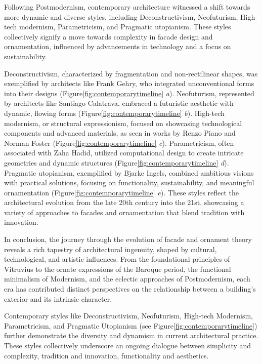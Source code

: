 
Following Postmodernism, contemporary architecture witnessed a shift towards more dynamic and diverse styles, including Deconstructivism, Neofuturism, High-tech modernism, Parametricism, and Pragmatic utopianism.
These styles collectively signify a move towards complexity in facade design and ornamentation, influenced by advancements in technology and a focus on sustainability.

Deconstructivism, characterized by fragmentation and non-rectilinear shapes, was exemplified by architects like Frank Gehry, who integrated unconventional forms into their designs (Figure\ref{fig:contemporarytimeline} \textit{a}).
Neofuturism, represented by architects like Santiago Calatrava, embraced a futuristic aesthetic with dynamic, flowing forms (Figure\ref{fig:contemporarytimeline} \textit{b}).
High-tech modernism, or structural expressionism, focused on showcasing technological components and advanced materials, as seen in works by Renzo Piano and Norman Foster (Figure\ref{fig:contemporarytimeline} \textit{c}).
Parametricism, often associated with Zaha Hadid, utilized computational design to create intricate geometries and dynamic structures (Figure\ref{fig:contemporarytimeline} \textit{d}).
Pragmatic utopianism, exemplified by Bjarke Ingels, combined ambitious visions with practical solutions, focusing on functionality, sustainability, and meaningful ornamentation (Figure\ref{fig:contemporarytimeline} \textit{e}).
These styles reflect the architectural evolution from the late 20th century into the 21st, showcasing a variety of approaches to facades and ornamentation that blend tradition with innovation.


In conclusion, the journey through the evolution of facade and ornament theory reveals a rich tapestry of architectural ingenuity, shaped by cultural, technological, and artistic influences.
From the foundational principles of Vitruvius to the ornate expressions of the Baroque period, the functional minimalism of Modernism, and the eclectic approaches of Postmodernism, each era has contributed distinct perspectives on the relationship between a building's exterior and its intrinsic character.

Contemporary styles like Deconstructivism, Neofuturism, High-tech Modernism, Parametricism, and Pragmatic Utopianism (see Figure\ref{fig:contemporarytimeline}) further demonstrate the diversity and dynamism in current architectural practice.
These styles collectively underscore an ongoing dialogue between simplicity and complexity, tradition and innovation, functionality and aesthetics.

